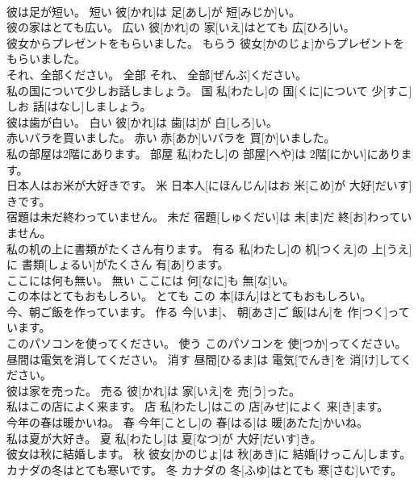 \documentclass[8pt]{extreport}
\begin{document}
\begin{CJK}{UTF8}{min}
\\	彼は足が短い。	短い	彼[かれ]は 足[あし]が 短[みじか]い。	
\\	彼の家はとても広い。	広い	彼[かれ]の 家[いえ]はとても 広[ひろ]い。	
\\	彼女からプレゼントをもらいました。	もらう	彼女[かのじょ]からプレゼントをもらいました。	
\\	それ、全部ください。	全部	それ、 全部[ぜんぶ]ください。	
\\	私の国について少しお話しましょう。	国	私[わたし]の 国[くに]について 少[すこ]しお 話[はなし]しましょう。	
\\	彼は歯が白い。	白い	彼[かれ]は 歯[は]が 白[しろ]い。	
\\	赤いバラを買いました。	赤い	赤[あか]いバラを 買[か]いました。	
\\	私の部屋は2階にあります。	部屋	私[わたし]の 部屋[へや]は 2階[にかい]にあります。	
\\	日本人はお米が大好きです。	米	日本人[にほんじん]はお 米[こめ]が 大好[だいす]きです。	
\\	宿題は未だ終わっていません。	未だ	宿題[しゅくだい]は 未[ま]だ 終[お]わっていません。	
\\	私の机の上に書類がたくさん有ります。	有る	私[わたし]の 机[つくえ]の 上[うえ]に 書類[しょるい]がたくさん 有[あ]ります。	
\\	ここには何も無い。	無い	ここには 何[なに]も 無[な]い。	
\\	この本はとてもおもしろい。	とても	この 本[ほん]はとてもおもしろい。	
\\	今、朝ご飯を作っています。	作る	今[いま]、 朝[あさ]ご 飯[はん]を 作[つく]っています。	
\\	このパソコンを使ってください。	使う	このパソコンを 使[つか]ってください。	
\\	昼間は電気を消してください。	消す	昼間[ひるま]は 電気[でんき]を 消[け]してください。	
\\	彼は家を売った。	売る	彼[かれ]は 家[いえ]を 売[う]った。	
\\	私はこの店によく来ます。	店	私[わたし]はこの 店[みせ]によく 来[き]ます。	
\\	今年の春は暖かいね。	春	今年[ことし]の 春[はる]は 暖[あたた]かいね。	
\\	私は夏が大好き。	夏	私[わたし]は 夏[なつ]が 大好[だいす]き。	
\\	彼女は秋に結婚します。	秋	彼女[かのじょ]は 秋[あき]に 結婚[けっこん]します。	
\\	カナダの冬はとても寒いです。	冬	カナダの 冬[ふゆ]はとても 寒[さむ]いです。	

\end{CJK}
\end{document}
